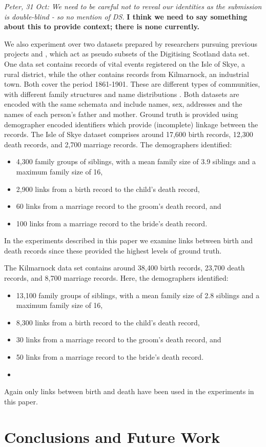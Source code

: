 \documentclass{llncs}
\begin{document}
\emph{Peter, 31 Oct: We need to be careful not to reveal our identities
as the submission is double-blind - so no mention of DS.}
\textbf{I think we need to say something about this to provide context; there is none currently.}


We also experiment over two datasets prepared by researchers pursuing previous projects \cite{reid2002} and \cite{reid2006}, which act as pseudo subsets of the Digitising Scotland data set. One data set contains records of vital events registered on the Isle of Skye, a rural district, while the other contains records from Kilmarnock, an industrial town. Both cover the period 1861-1901. These are different types of communities, with different family structures and name distributions \cite{reid2002}. Both datasets are encoded with the same schemata and include names, sex, addresses and the names of each person's father and mother. Ground truth is provided using demographer encoded identifiers which provide (incomplete) linkage between the records.  The Isle of Skye dataset comprises around 17,600 birth records, 12,300 death records, and 2,700 marriage records.
The demographers  identified:
\begin{itemize}
\item 4,300 family groups of siblings, with a mean family size of 3.9 siblings and a maximum family size of 16,
\item 2,900 links from a birth record to the child's death record,
\item 60 links from a marriage record to the groom's death record, and
\item 100 links from a marriage record to the bride's death record.
\end{itemize}
In the experiments described in this paper we examine links between birth and death records since these provided the highest levels of ground truth.

The Kilmarnock data set contains around 38,400 birth records, 23,700 death records, and 8,700 marriage records. Here, the demographers identified:
\begin{itemize}
\item 13,100 family groups of siblings, with a mean family size of 2.8 siblings and a  maximum family size of 16,
\item 8,300 links from a birth record to the child's death record,
\item 30 links from a marriage record to the groom's death record, and
\item 50 links from a marriage record to the bride's death record.
\item 
\end{itemize}
Again only links between birth and death have been used in the experiments in this paper.



\section{Conclusions and Future Work}
\label{sec-concl}



 
\end{document}
